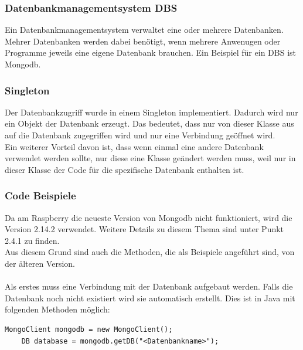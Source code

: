 \subsubsection{Datenbankmanagementsystem DBS}
Ein Datenbankmanagementsystem verwaltet eine oder mehrere Datenbanken. Mehrer Datenbanken werden dabei benötigt, wenn mehrere Anwenugen oder Programme jeweils eine eigene Datenbank brauchen. Ein Beispiel für ein DBS ist Mongodb.

\subsubsection{Singleton}
Der Datenbankzugriff wurde in einem Singleton implementiert. Dadurch wird nur ein Objekt der Datenbank erzeugt. Das bedeutet, dass nur von dieser Klasse aus auf die Datenbank zugegriffen wird und nur eine Verbindung geöffnet wird.
\\ Ein weiterer Vorteil davon ist, dass wenn einmal eine andere Datenbank verwendet werden sollte, nur diese eine Klasse geändert werden muss, weil nur in dieser Klasse der Code für die spezifische Datenbank enthalten ist.

\subsubsection{Code Beispiele}
Da am Raspberry die neueste Version von Mongodb nicht funktioniert, wird die Version 2.14.2 verwendet. Weitere Details zu diesem Thema sind unter Punkt 2.4.1 zu finden.
\\ Aus diesem Grund sind auch die Methoden, die als Beispiele angeführt sind, von der älteren Version. 
\\ \\ 
Als erstes muss eine Verbindung mit der Datenbank aufgebaut werden. Falls die Datenbank noch nicht existiert wird sie automatisch erstellt.
Dies ist in Java mit folgenden Methoden möglich:
\begin{lstlisting}[style=JavaStyle, caption=Mit Mongodb verbinden]
	MongoClient mongodb = new MongoClient();
	DB database = mongodb.getDB("<Datenbankname>");
\end{lstlisting}

